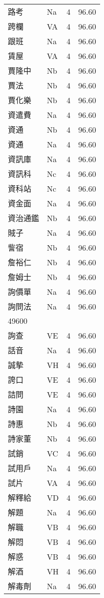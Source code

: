 \documentclass[twocolumn]{book}
\begin{document}
\begin{supertabular}{llrr}
路考 & Na & 4 &  96.60\\
跨欄 & VA & 4 &  96.60\\
跟班 & Na & 4 &  96.60\\
賃屋 & VA & 4 &  96.60\\
賈隆中 & Nb & 4 &  96.60\\
賈法 & Nb & 4 &  96.60\\
賈化樂 & Nb & 4 &  96.60\\
資遣費 & Na & 4 &  96.60\\
資通 & Nb & 4 &  96.60\\
資通 & Na & 4 &  96.60\\
資訊庫 & Na & 4 &  96.60\\
資訊科 & Nc & 4 &  96.60\\
資科站 & Nc & 4 &  96.60\\
資金面 & Na & 4 &  96.60\\
資治通鑑 & Nb & 4 &  96.60\\
賊子 & Na & 4 &  96.60\\
訾宿 & Nb & 4 &  96.60\\
詹裕仁 & Nb & 4 &  96.60\\
詹姆士 & Nb & 4 &  96.60\\
詢價單 & Na & 4 &  96.60\\
詢問法 & Na & 4 &  96.60\\
49600\\
詢查 & VE & 4 &  96.60\\
話音 & Na & 4 &  96.60\\
誠摰 & VH & 4 &  96.60\\
誇口 & VE & 4 &  96.60\\
詰問 & VE & 4 &  96.60\\
詩園 & Na & 4 &  96.60\\
詩惠 & Nb & 4 &  96.60\\
詩家董 & Nb & 4 &  96.60\\
試銷 & VC & 4 &  96.60\\
試用戶 & Na & 4 &  96.60\\
試片 & VA & 4 &  96.60\\
解釋給 & VD & 4 &  96.60\\
解題 & Na & 4 &  96.60\\
解職 & VB & 4 &  96.60\\
解悶 & VB & 4 &  96.60\\
解惑 & VB & 4 &  96.60\\
解酒 & VH & 4 &  96.60\\
解毒劑 & Na & 4 &  96.60\\

\end{supertabular}
\end{document}
